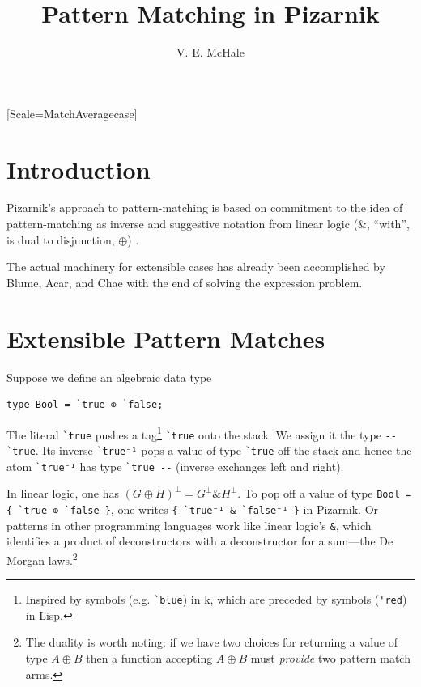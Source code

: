 \documentclass{article}
\begin{document}
\VerbatimFootnotes

\setmonofont{DejaVu Sans Mono}[Scale=MatchAveragecase]

\title{Pattern Matching in Pizarnik}
\author {V. E. McHale}
\maketitle

\tableofcontents

\def\mathtag#1{\thinspace\text{\textasciigrave} \mathtt{#1}}

\section{Introduction}

Pizarnik's approach to pattern-matching is based on commitment to the idea of pattern-matching as inverse\cite{ehrenberg2009} and suggestive notation from linear logic ($\&$, ``with'', is dual to disjunction, $\oplus$) \cite{munchmaccagnoni}.

The actual machinery for extensible cases has already been accomplished by Blume, Acar, and Chae \cite{blume2006} with the end of solving the expression problem.


\section{Extensible Pattern Matches}

Suppose we define an algebraic data type

\begin{verbatim}
type Bool = `true ⊕ `false;
\end{verbatim}

The literal \verb|`true| pushes a tag\footnote{Inspired by symbols (e.g. \verb|`blue|) in k, which are preceded by symbols (\verb|'red|) in Lisp.}  \verb|`true| onto the stack. We assign it the type \verb|-- `true|. Its inverse \verb|`true⁻¹| pops a value of type \verb|`true| off the stack and hence the atom \verb|`true⁻¹| has type \verb|`true --| (inverse exchanges left and right).


In linear logic, one has $(G\oplus H)^\bot = G^\bot \& H ^\bot$. To pop off a value of type \verb|Bool = { `true ⊕ `false }|, one writes \verb|{ `true⁻¹ & `false⁻¹ }| in Pizarnik. Or-patterns in other programming languages work like linear logic's \verb|&|, which identifies a product of deconstructors with a deconstructor for a sum---the De Morgan laws.\footnote{The duality is worth noting: if we have two choices for returning a value of type $A\oplus B$ then a function accepting $A\oplus B$ must \textit{provide} two pattern match arms.}
\end{document}
